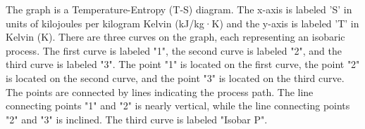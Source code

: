 The graph is a Temperature-Entropy (T-S) diagram. The x-axis is labeled 'S' in units of kilojoules per kilogram Kelvin (kJ/kg·K) and the y-axis is labeled 'T' in Kelvin (K). There are three curves on the graph, each representing an isobaric process. The first curve is labeled "1", the second curve is labeled "2", and the third curve is labeled "3". The point "1" is located on the first curve, the point "2" is located on the second curve, and the point "3" is located on the third curve. The points are connected by lines indicating the process path. The line connecting points "1" and "2" is nearly vertical, while the line connecting points "2" and "3" is inclined. The third curve is labeled "Isobar P".